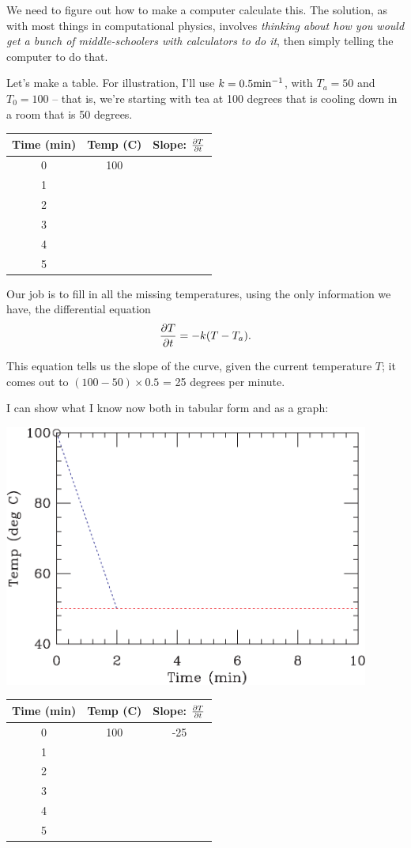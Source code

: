 \documentclass[12ampt]{article}
\def\PAR#1#2{ {{\partial #1}\over{\partial #2}} }
\begin{document}
We need to figure out how to make a computer calculate this. The solution, as 
with most things in computational physics, involves {\it thinking about how you
would get a bunch of middle-schoolers with calculators to do it}, then simply 
telling the computer to do that.

Let's make a table. For illustration, I'll use $k=0.5 {\rm min}^{-1}$, with
$T_a=50$ and $T_0=100$ -- that is, we're starting with tea at 100 degrees that is
cooling down in a room that is 50 degrees.

\begin{tabular}{|c | c | c |}
\hline
Time (min) & Temp (C) & Slope: $\PAR{T}{t}$ \\
\hline
0 & 100 & \\
\hline
1 & &  \\
\hline
2 & &  \\
\hline
3 & &  \\
\hline
4 & &  \\
\hline
5 & &  \\
\hline
\end{tabular}

Our job is to fill in all the missing temperatures, using the only information we
have, the differential equation $$\PAR{T}{t}=-k(T-T_a).$$

This equation tells us the slope of the curve, given the current temperature $T$;
it comes out to $(100-50) \times 0.5$ = 25 degrees per minute.

I can show what I know now both in tabular form and as a graph:

\begin{minipage}{0.5\textwidth}
\includegraphics[width=0.9\textwidth]{fig0-crop.pdf}
\end{minipage}
\begin{minipage}{0.5\textwidth}
\begin{tabular}{|c | c | c |}
\hline
Time (min) & Temp (C) & Slope: $\PAR{T}{t}$ \\
\hline
0 & 100 & -25 \\
\hline
1 & &  \\
\hline
2 & &  \\
\hline
3 & &  \\
\hline
4 & &  \\
\hline
5 & &  \\
\hline
\end{tabular}
\end{minipage}
\end{document}
